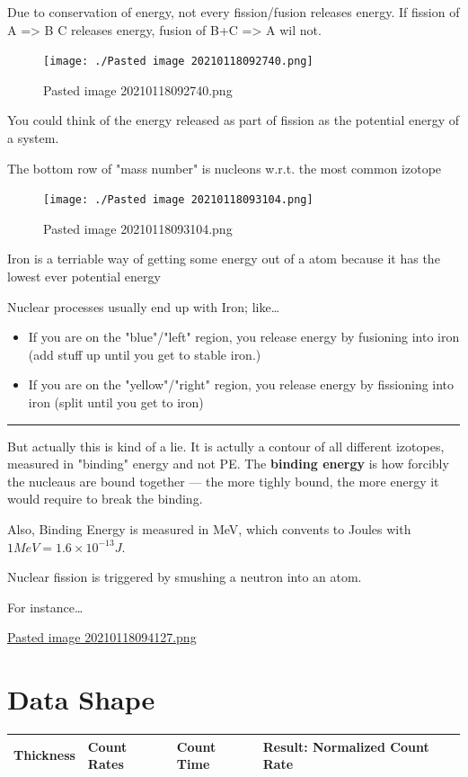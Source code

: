 \documentclass[letterpaper]{article}
\begin{document}
Due to conservation of energy, not every fission/fusion releases energy.
If fission of A => B C releases energy, fusion of B+C => A wil not.

\begin{figure}[htbp]
\centering
\texttt{[image: ./Pasted image 20210118092740.png]}
\caption{Pasted image 20210118092740.png}
\end{figure}

You could think of the energy released as part of fission as the
potential energy of a system.

The bottom row of "mass number" is nucleons w.r.t. the most common
izotope

\begin{figure}[htbp]
\centering
\texttt{[image: ./Pasted image 20210118093104.png]}
\caption{Pasted image 20210118093104.png}
\end{figure}

Iron is a terriable way of getting some energy out of a atom because it
has the lowest ever potential energy

Nuclear processes usually end up with Iron; like\ldots{}

\begin{itemize}
\item If you are on the "blue"/"left" region, you release energy by
fusioning into iron (add stuff up until you get to stable iron.)
\item If you are on the "yellow"/"right" region, you release energy by
fissioning into iron (split until you get to iron)
\end{itemize}

\noindent\rule{\textwidth}{0.5pt}

But actually this is kind of a lie. It is actully a contour of all
different izotopes, measured in "binding" energy and not PE. The
\textbf{binding energy} is how forcibly the nucleaus are bound together --- the
more tighly bound, the more energy it would require to break the
binding.

Also, Binding Energy is measured in MeV, which convents to Joules with
\(1 MeV = 1.6 \times 10^{-13} J\).

Nuclear fission is triggered by smushing a neutron into an atom.

For instance\ldots{}

\href{Pasted image 20210118094127.png.org}{Pasted image
20210118094127.png}

\section{Data Shape}
\label{sec:org15ce993}
\begin{center}
\begin{tabular}{llll}
Thickness & Count Rates & Count Time & Result: Normalized Count Rate\\
\hline
\end{tabular}
\end{center}
\end{document}
